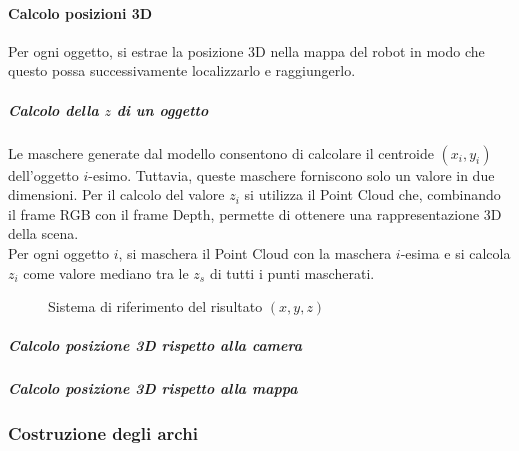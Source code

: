 \paragraph{Calcolo posizioni 3D}
Per ogni oggetto, si estrae la posizione 3D nella mappa del robot in modo che questo possa successivamente localizzarlo e raggiungerlo.
\subparagraph{Calcolo della $z$ di un oggetto}
Le maschere generate dal modello consentono di calcolare il centroide $(x_i, y_i)$ dell'oggetto $i$-esimo. Tuttavia, queste maschere forniscono solo un valore in due dimensioni. Per il calcolo del valore $z_i$ si utilizza il Point Cloud che, combinando il frame RGB con il frame Depth, permette di ottenere una rappresentazione 3D della scena. \\
Per ogni oggetto $i$, si maschera il Point Cloud con la maschera $i$-esima e si calcola $z_i$ come valore mediano tra le $z_s$ di tutti i punti mascherati.
\begin{figure}[h]
  \caption{Sistema di riferimento del risultato $(x,y,z)$}
\end{figure}
  
\subparagraph{Calcolo posizione 3D rispetto alla camera}
\subparagraph{Calcolo posizione 3D rispetto alla mappa}
\subsubsection{Costruzione degli archi}

